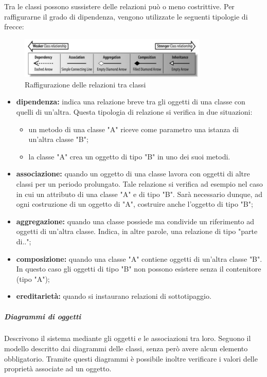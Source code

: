 \noindent Tra le classi possono sussistere delle relazioni può o meno costrittive. Per raffigurarne il grado di dipendenza, vengono utilizzate le seguenti tipologie di frecce:
\begin{figure}[h!]
	\caption{Raffigurazione delle relazioni tra classi}
	\centering
	\includegraphics[width=0.8\textwidth]{res/img/relazioniClassi.png}
\end{figure}
\begin{itemize}
	\item \textbf{dipendenza:} indica una relazione breve tra gli oggetti di una classe con quelli di un'altra. Questa tipologia di relazione si verifica in due situazioni:
	\begin{itemize}
		\item un metodo di una classe "A" riceve come parametro una istanza di un'altra classe "B";
		\item la classe "A" crea un oggetto di tipo "B" in uno dei suoi metodi.
	\end{itemize}
	\item \textbf{associazione:} quando un oggetto di una classe lavora con oggetti di altre classi per un periodo prolungato. Tale relazione si verifica ad esempio nel caso in cui un attributo di una classe "A" e di tipo "B". Sarà necessario dunque, ad ogni costruzione di un oggetto di "A", costruire anche l'oggetto di tipo "B";
	\item \textbf{aggregazione:}  quando una classe possiede ma condivide un riferimento ad oggetti di
	un’altra classe. Indica, in altre parole, una relazione di tipo "parte di..";
	\item \textbf{composizione:} quando una classe "A" contiene oggetti di un’altra classe "B". In questo caso gli oggetti di tipo "B" non possono esistere senza il contenitore (tipo "A");
	\item \textbf{ereditarietà:} quando si instaurano relazioni di sottotipaggio.
\end{itemize}

\subparagraph*{Diagrammi di oggetti} Descrivono il sistema mediante gli oggetti e le associazioni tra loro. Seguono il modello descritto dai diagrammi delle classi, senza però avere alcun elemento obbligatorio. Tramite questi diagrammi è possibile inoltre verificare i valori delle proprietà associate ad un oggetto.

